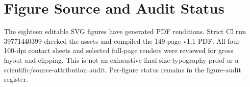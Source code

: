 \section{Figure Source and Audit Status}
\label{app:figures}

The eighteen editable SVG figures have generated PDF renditions. Strict CI run 39771440399 checked the assets and compiled the 149-page v1.1 PDF. All four 100-dpi contact sheets and selected full-page renders were reviewed for gross layout and clipping. This is not an exhaustive final-size typography proof or a scientific/source-attribution audit. Per-figure status remains in the figure-audit register.

